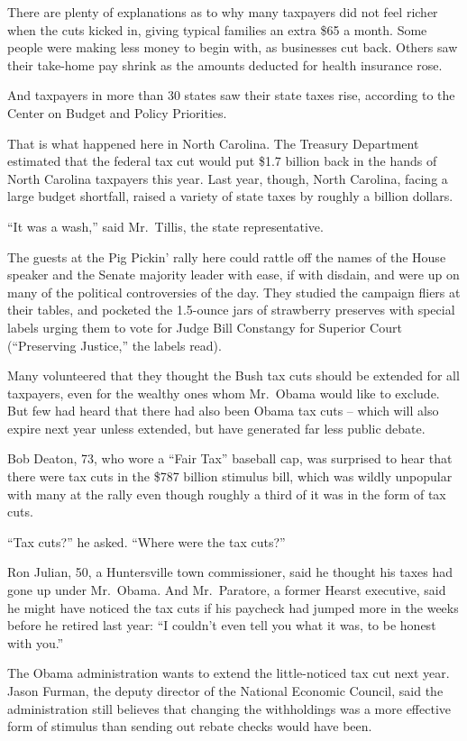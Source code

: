 ﻿\documentclass[12pt]{article}
\begin{document}
There are plenty of explanations as to why many taxpayers did not feel richer when the cuts kicked
in, giving typical families an extra \$65 a month. Some people were making less money to begin with,
as businesses cut back. Others saw their take-home pay shrink as the amounts deducted for health
insurance rose.

And taxpayers in more than 30 states saw their state taxes rise, according to the Center on Budget
and Policy Priorities.

That is what happened here in North Carolina. The Treasury Department estimated that the federal tax
cut would put \$1.7 billion back in the hands of North Carolina taxpayers this year. Last year,
though, North Carolina, facing a large budget shortfall, raised a variety of state taxes by roughly
a billion dollars.

``It was a wash,'' said Mr.~Tillis, the state representative.

The guests at the Pig Pickin' rally here could rattle off the names of the House speaker and the
Senate majority leader with ease, if with disdain, and were up on many of the political
controversies of the day. They studied the campaign fliers at their tables, and pocketed the
1.5-ounce jars of strawberry preserves with special labels urging them to vote for Judge Bill
Constangy for Superior Court (``Preserving Justice,'' the labels read).

Many volunteered that they thought the Bush tax cuts should be extended for all taxpayers, even for
the wealthy ones whom Mr.~Obama would like to exclude. But few had heard that there had also been
Obama tax cuts -- which will also expire next year unless extended, but have generated far less
public debate.

Bob Deaton, 73, who wore a ``Fair Tax'' baseball cap, was surprised to hear that there were tax cuts
in the \$787 billion stimulus bill, which was wildly unpopular with many at the rally even though
roughly a third of it was in the form of tax cuts.

``Tax cuts?'' he asked. ``Where were the tax cuts?''

Ron Julian, 50, a Huntersville town commissioner, said he thought his taxes had gone up under
Mr.~Obama. And Mr.~Paratore, a former Hearst executive, said he might have noticed the tax cuts if
his paycheck had jumped more in the weeks before he retired last year: ``I couldn't even tell you
what it was, to be honest with you.''

The Obama administration wants to extend the little-noticed tax cut next year. Jason Furman, the
deputy director of the National Economic Council, said the administration still believes that
changing the withholdings was a more effective form of stimulus than sending out rebate checks would
have been.
\end{document}
